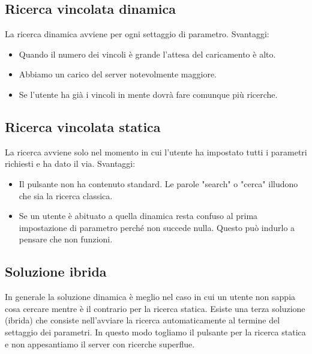 					
		\subsection{Ricerca vincolata dinamica}
			La ricerca dinamica avviene per ogni settaggio di parametro.
			Svantaggi:
			\begin{itemize}
				\item Quando il numero dei vincoli è grande l'attesa del caricamento è alto.
				\item Abbiamo un carico del server notevolmente maggiore.
				\item Se l'utente ha già i vincoli in mente dovrà fare comunque più ricerche.
			\end{itemize}
	
		\subsection{Ricerca vincolata statica}
			La ricerca avviene solo nel momento in cui l'utente ha impostato tutti i parametri richiesti e ha dato il via.
			Svantaggi:
			\begin{itemize}
				\item Il pulsante non ha contenuto standard. Le parole "search" o "cerca" illudono che sia la ricerca classica. 
				\item Se un utente è abituato a quella dinamica resta confuso al prima impostazione di parametro perché non succede nulla. Questo può indurlo a pensare che non funzioni.
			\end{itemize}
		
		\subsection{Soluzione ibrida}
			In generale la soluzione dinamica è meglio nel caso in cui un utente non sappia cosa cercare mentre è il contrario per la ricerca statica. Esiste una terza soluzione (ibrida) che consiste nell'avviare la ricerca automaticamente al termine del settaggio dei parametri. In questo modo togliamo il pulsante per la ricerca statica e non appesantiamo il server con ricerche superflue.
		
